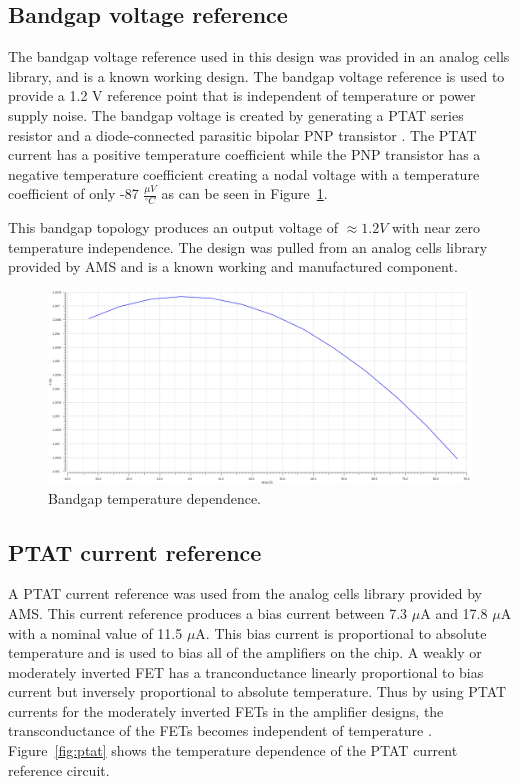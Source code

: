 \documentclass[12pt,oneside,final]{siuethesis}
\theoremstyle{definition}
\begin{document}
\subsection{Bandgap voltage reference}
\par The bandgap voltage reference used in this design was provided in an analog cells library, and is a known working design. The bandgap voltage reference is used to provide a 1.2 V reference point that is independent of temperature or power supply noise. The bandgap voltage is created by generating a PTAT series resistor and a diode-connected parasitic bipolar PNP transistor \cite{ALLEN}. The PTAT current has a positive temperature coefficient while the PNP transistor has a negative temperature coefficient creating a nodal voltage with a temperature coefficient of only -87 $\frac{\mu V}{^{\circ}C}$ as can be seen in Figure~\ref{fig:bandgap}.
\par This bandgap topology produces an output voltage of $\approx 1.2 V$ with near zero temperature independence. The design was pulled from an analog cells library provided by AMS and is a known working and manufactured component.

\begin{figure}[htbp!]
\centering
\includegraphics[scale=.3,keepaspectratio=true]{../data/bandgap_temp.png} 
\caption{Bandgap temperature dependence.}
\label{fig:bandgap}
\end{figure}

\subsection{PTAT current reference}
\par A PTAT current reference was used from the analog cells library provided by AMS. This current reference produces a bias current between 7.3 $\mu$A and 17.8 $\mu$A with a nominal value of 11.5 $\mu$A. This bias current is proportional to absolute temperature and is used to bias all of the amplifiers on the chip. A weakly or moderately inverted FET has a tranconductance linearly proportional to bias current but inversely proportional to absolute temperature. Thus by using PTAT currents for the moderately inverted FETs in the amplifier designs, the transconductance of the FETs becomes independent of temperature \cite{ALLEN}. Figure~\ref{fig:ptat} shows the temperature dependence of the PTAT current reference circuit.
\end{document}

